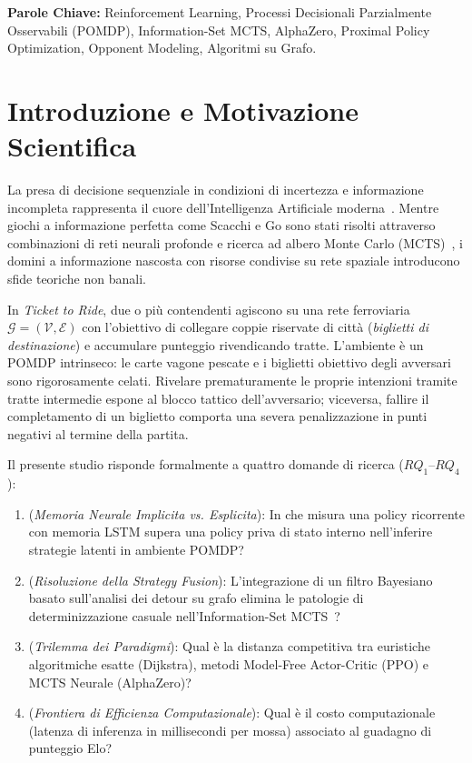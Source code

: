 \documentclass[11pt,a4paper]{article}
\begin{document}
\vspace{0.5cm}
\noindent\textbf{Parole Chiave:} Reinforcement Learning, Processi Decisionali Parzialmente Osservabili (POMDP), Information-Set MCTS, AlphaZero, Proximal Policy Optimization, Opponent Modeling, Algoritmi su Grafo.

\newpage

\section{Introduzione e Motivazione Scientifica}
\label{sec:intro}
La presa di decisione sequenziale in condizioni di incertezza e informazione incompleta rappresenta il cuore dell'Intelligenza Artificiale moderna~\cite{sutton2018reinforcement}. Mentre giochi a informazione perfetta come Scacchi e Go sono stati risolti attraverso combinazioni di reti neurali profonde e ricerca ad albero Monte Carlo (MCTS)~\cite{silver2017mastering, silver2018general}, i domini a informazione nascosta con risorse condivise su rete spaziale introducono sfide teoriche non banali.

In \textit{Ticket to Ride}, due o più contendenti agiscono su una rete ferroviaria $\mathcal{G} = (\mathcal{V}, \mathcal{E})$ con l'obiettivo di collegare coppie riservate di città (\textit{biglietti di destinazione}) e accumulare punteggio rivendicando tratte. L'ambiente è un POMDP intrinseco: le carte vagone pescate e i biglietti obiettivo degli avversari sono rigorosamente celati. Rivelare prematuramente le proprie intenzioni tramite tratte intermedie espone al blocco tattico dell'avversario; viceversa, fallire il completamento di un biglietto comporta una severa penalizzazione in punti negativi al termine della partita.

Il presente studio risponde formalmente a quattro domande di ricerca ($RQ_1$--$RQ_4$):
\begin{enumerate}
    \item[$\mathbf{RQ_1}$] (\textit{Memoria Neurale Implicita vs. Esplicita}): In che misura una policy ricorrente con memoria LSTM supera una policy priva di stato interno nell'inferire strategie latenti in ambiente POMDP?
    \item[$\mathbf{RQ_2}$] (\textit{Risoluzione della Strategy Fusion}): L'integrazione di un filtro Bayesiano basato sull'analisi dei detour su grafo elimina le patologie di determinizzazione casuale nell'Information-Set MCTS~\cite{cowling2012information}?
    \item[$\mathbf{RQ_3}$] (\textit{Trilemma dei Paradigmi}): Qual è la distanza competitiva tra euristiche algoritmiche esatte (Dijkstra), metodi Model-Free Actor-Critic (PPO) e MCTS Neurale (AlphaZero)?
    \item[$\mathbf{RQ_4}$] (\textit{Frontiera di Efficienza Computazionale}): Qual è il costo computazionale (latenza di inferenza in millisecondi per mossa) associato al guadagno di punteggio Elo?
\end{enumerate}
\end{document}
